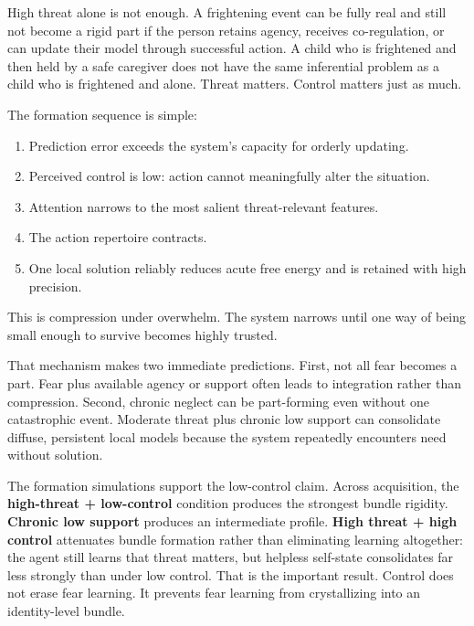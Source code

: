 \documentclass[11pt,a4paper]{article}
\makeatletter
\providecommand{\tightlist}{%
  \setlength{\itemsep}{0pt}\setlength{\parskip}{0pt}}
\renewcommand\section{\@startsection{section}{1}{0pt}{2.3ex plus 0.6ex minus 0.2ex}{1.1ex plus 0.2ex}{\large\bfseries}}
\makeatother
\begin{document}
High threat alone is not enough. A frightening event can be fully real
and still not become a rigid part if the person retains agency, receives
co-regulation, or can update their model through successful action. A
child who is frightened and then held by a safe caregiver does not have
the same inferential problem as a child who is frightened and alone.
Threat matters. Control matters just as much.

The formation sequence is simple:

\begin{enumerate}
\def\labelenumi{\arabic{enumi}.}
\tightlist
\item
  Prediction error exceeds the system's capacity for orderly updating.
\item
  Perceived control is low: action cannot meaningfully alter the
  situation.
\item
  Attention narrows to the most salient threat-relevant features.
\item
  The action repertoire contracts.
\item
  One local solution reliably reduces acute free energy and is retained
  with high precision.
\end{enumerate}

This is compression under overwhelm. The system narrows until one way of
being small enough to survive becomes highly trusted.

That mechanism makes two immediate predictions. First, not all fear
becomes a part. Fear plus available agency or support often leads to
integration rather than compression. Second, chronic neglect can be
part-forming even without one catastrophic event. Moderate threat plus
chronic low support can consolidate diffuse, persistent local models
because the system repeatedly encounters need without solution.

The formation simulations support the low-control claim. Across
acquisition, the \textbf{high-threat + low-control} condition produces
the strongest bundle rigidity. \textbf{Chronic low support} produces an
intermediate profile. \textbf{High threat + high control} attenuates
bundle formation rather than eliminating learning altogether: the agent
still learns that threat matters, but helpless self-state consolidates
far less strongly than under low control. That is the important result.
Control does not erase fear learning. It prevents fear learning from
crystallizing into an identity-level bundle.

\section{How Parts Persist}\label{how-parts-persist}
\end{document}
